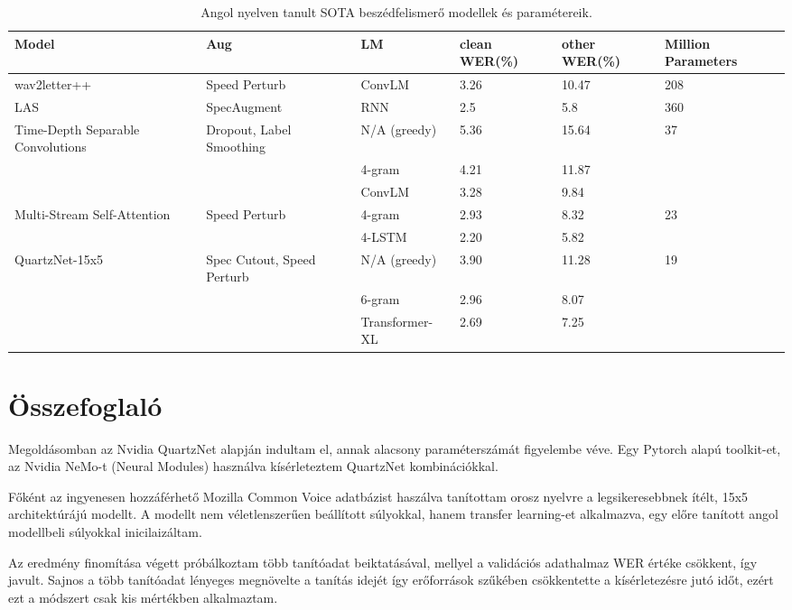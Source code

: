 \begin{table}[ht]
	\footnotesize
	\centering
	\begin{tabular}{ p{2cm} p{2.5cm} p{2.5cm} p{1.5cm} p{1.5cm} p{1.5cm} }
		\toprule
		\textbf{Model} & \textbf{Aug} & \textbf{LM} & \textbf{clean WER(\%)} & \textbf{other WER(\%)} & \textbf{Million Parameters} \\
		\midrule
		wav2letter++ & Speed Perturb & ConvLM & 3.26 & 10.47 & 208 \\
		\hline
		LAS & SpecAugment & RNN & 2.5 & 5.8 & 360 \\
		\hline
		Time-Depth Separable Convolutions & Dropout, Label Smoothing & N/A (greedy) & 5.36 & 15.64 & 37 \\
		&  & 4-gram & 4.21 & 11.87 &  \\
		&  & ConvLM & 3.28 & 9.84 &  \\
		\hline
		Multi-Stream Self-Attention & Speed Perturb & 4-gram & 2.93 & 8.32 & 23  \\
		&  & 4-LSTM & 2.20 & 5.82 &  \\
		\hline
		QuartzNet-15x5 & Spec Cutout, Speed Perturb & N/A (greedy) & 3.90 & 11.28 & 19 \\
		&  & 6-gram & 2.96 & 8.07 &  \\
		&  & Transformer-XL & 2.69 & 7.25 &  \\
		\bottomrule
	\end{tabular}
	\caption{Angol nyelven tanult SOTA beszédfelismerő modellek és paramétereik.}
\end{table}

\section{Összefoglaló}

Megoldásomban az Nvidia QuartzNet alapján indultam el, annak alacsony paraméterszámát figyelembe véve. Egy Pytorch alapú toolkit-et, az Nvidia NeMo-t (Neural Modules) használva kísérleteztem QuartzNet kombinációkkal.

Főként az ingyenesen hozzáférhető Mozilla Common Voice adatbázist haszálva tanítottam orosz nyelvre a legsikeresebbnek ítélt, 15x5 architektúrájú modellt. A modellt nem véletlenszerűen beállított súlyokkal, hanem transfer learning-et alkalmazva, egy előre tanított angol modellbeli súlyokkal inicilaizáltam.

Az eredmény finomítása végett próbálkoztam több tanítóadat beiktatásával, mellyel a validációs adathalmaz WER értéke csökkent, így javult. Sajnos a több tanítóadat lényeges megnövelte a tanítás idejét így erőforrások szűkében csökkentette a kísérletezésre jutó időt, ezért ezt a módszert csak kis mértékben alkalmaztam.

